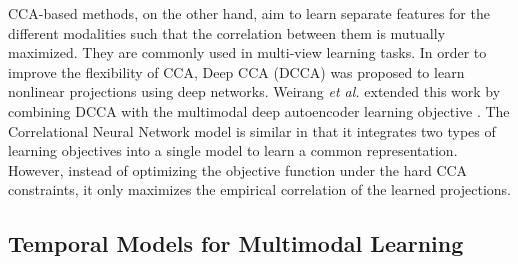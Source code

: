 \documentclass[10pt,twocolumn,letterpaper]{article}
\begin{document}
CCA-based methods, on the other hand, aim to learn separate features for the different modalities such that the correlation between them is mutually maximized. They are commonly used in multi-view learning tasks. In order to improve the flexibility of CCA, Deep CCA (DCCA) \cite{andrew2013deep} was proposed to learn nonlinear projections using deep networks. Weirang \textit{et al.} \cite{wang2015deep} extended this work by combining DCCA with the multimodal deep autoencoder learning objective \cite{ngiam2011multimodal}. The Correlational Neural Network model \cite{chandar2015correlational} is similar in that it integrates two types of learning objectives into a single model to learn a common representation. However, instead of optimizing the objective function under the hard CCA constraints, it only maximizes the empirical correlation of the learned projections.



\subsection{Temporal Models for Multimodal Learning}
\end{document}
